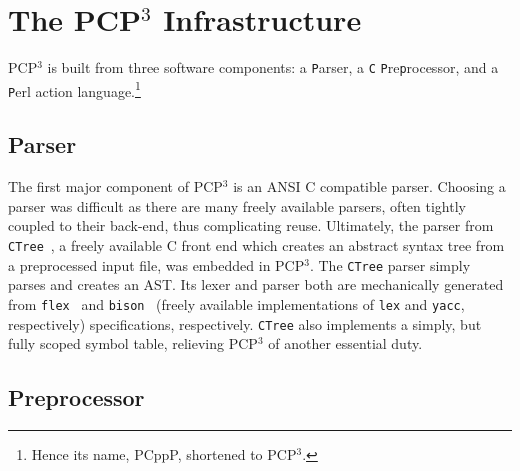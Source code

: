 \documentclass{article}
\newcommand{\pcp}{\mbox{\textsf{PCP}$^3$}}
\newcommand{\pcppp}{\mbox{\textsf{PCppP}}}
\newcommand{\C}{\mbox{\textsf{C}}}
\begin{document}


\section{The \pcp{} Infrastructure}
\label{sec:pcp3}
\pcp{} is built from three software components: a \texttt{P}arser, a \texttt{C}
\texttt{P}re\texttt{p}rocessor, and a \texttt{P}erl action
language.\footnote{Hence its name, \pcppp{}, shortened to \pcp{}.}

\subsection{Parser}

The first major component of \pcp{} is an ANSI \C{} compatible parser.
Choosing a parser was difficult as there are many freely available
parsers, often tightly coupled to their back-end, thus complicating
reuse.  Ultimately, the parser from \texttt{CTree}~\cite{CTree}, a
freely available \C{} front end which creates an abstract syntax tree
from a preprocessed input file, was embedded in \pcp{}.  The
\texttt{CTree} parser simply parses and creates an AST.  Its lexer and
parser both are mechanically generated from
\texttt{flex}~\cite{Flex,Levine92} and
\texttt{bison}~\cite{Bison,Levine92} (freely available implementations
of \texttt{lex} and \texttt{yacc}, respectively) specifications,
respectively.  \texttt{CTree} also implements a simply, but fully scoped
symbol table, relieving \pcp{} of another essential duty.

\subsection{Preprocessor}
\end{document}
